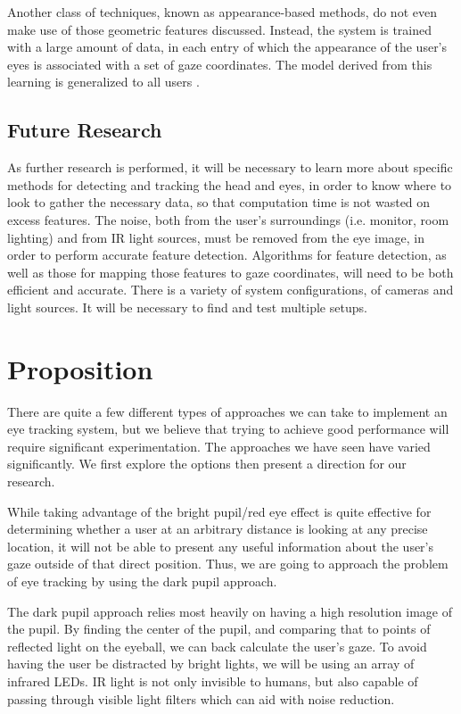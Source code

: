 \documentclass[12pt,conference,onecolumn]{IEEEtran}
\begin{document}
Another class of techniques, known as appearance-based methods, do not even make use of those geometric features discussed. Instead, the system is trained with a large amount of data, in each entry of which the appearance of the user's eyes is associated with a set of gaze coordinates. The model derived from this learning is generalized to all users \cite{morimoto}.
\subsection{Future Research}

As further research is performed, it will be necessary to learn more about specific methods for detecting and tracking the head and eyes, in order to know where to look to gather the necessary data, so that computation time is not wasted on excess features. The noise, both from the user's surroundings (i.e. monitor, room lighting) and from IR light sources, must be removed from the eye image, in order to perform accurate feature detection. Algorithms for feature detection, as well as those for mapping those features to gaze coordinates, will need to be both efficient and accurate. There is a variety of system configurations, of cameras and light sources. It will be necessary to find and test multiple setups. 
\section{Proposition} \label{sec:proposition}
There are quite a few different types of approaches we can take to implement an eye tracking system, but we believe that trying to achieve good performance will require significant experimentation. The approaches we have seen have varied significantly.  We first explore the options then present a direction for our research.

While taking advantage of the bright pupil/red eye effect is quite effective for determining whether a user at an arbitrary distance is looking at any precise location, it will not be able to present any useful information  about the user’s gaze outside of that direct position.  Thus, we are going to approach the problem of eye tracking by using the dark pupil approach.
	
The dark pupil approach relies most heavily on having a high resolution image of the pupil. By finding the center of the pupil, and comparing that to points of reflected light on the eyeball, we can back calculate the user’s gaze. To avoid having the user be distracted by bright lights, we will be using an array of infrared LEDs. IR light is not only invisible to humans, but also capable of passing through visible light filters which can aid with noise reduction. 
	
\end{document}
